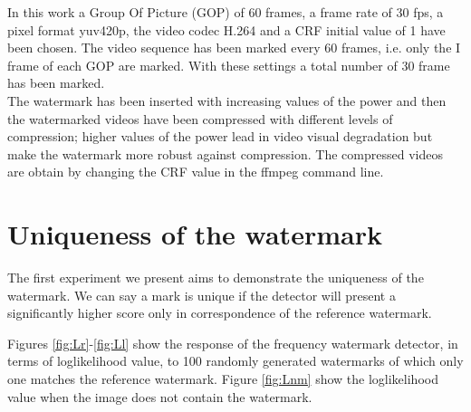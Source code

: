 In this work a Group Of Picture (GOP) of 60 frames, a frame rate of 30 fps, a pixel format yuv420p, the video codec H.264 and a CRF initial value of 1 have been chosen.\newline 
The video sequence has been marked every 60 frames, i.e. only the I frame of each GOP are marked.\newline 
With these settings a total number of 30 frame has been marked.\\
The watermark has been inserted with increasing values of the power and then the watermarked videos have been compressed with different levels of compression; higher values of the power lead in video visual degradation but make the watermark more robust against compression. \newline 
The compressed videos are obtain by changing the CRF value in the ffmpeg command line.



\section{Uniqueness of the watermark}

The first experiment we present aims to demonstrate the uniqueness of the watermark. We can say a mark is unique if the detector will present a significantly higher score only in correspondence of the reference watermark. 

Figures \ref{fig:Lr}-\ref{fig:Ll} show the response of the frequency watermark detector, in terms of loglikelihood value, to 100 randomly generated watermarks of which only one matches the reference watermark. Figure \ref{fig:Lnm} show the loglikelihood value when the image does not contain the watermark.

